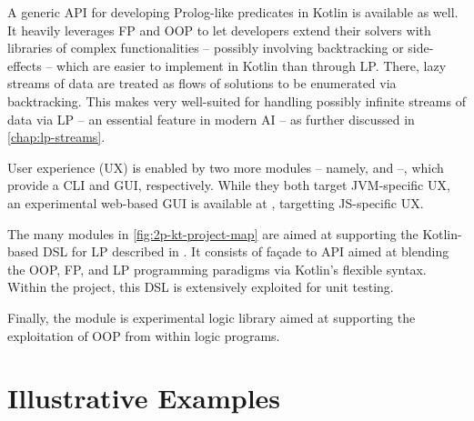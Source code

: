 \documentclass[12pt,a4paper,openright,twoside]{book}
\begin{document}
A generic API for developing Prolog-like predicates in Kotlin is available as well.
%
It heavily leverages FP and OOP to let developers extend their solvers with libraries of complex functionalities -- possibly involving backtracking or side-effects -- which are easier to implement in Kotlin than through LP.
%
There, lazy streams of data are treated as flows of solutions to be enumerated via backtracking.
%
This makes \twopkt{} very well-suited for handling possibly infinite streams of data via LP -- an essential feature in modern AI -- as further discussed in \cref{chap:lp-streams}.

User experience (UX) is enabled by two more modules -- namely,  and  --, which provide a CLI and GUI, respectively.
%
While they both target JVM-specific UX, an experimental web-based GUI is available at \cite{2P-Playground}, targetting JS-specific UX.

The many  modules in \cref{fig:2p-kt-project-map} are aimed at supporting the Kotlin-based DSL for LP described in \cite{kotlindsi4prolog-woa2020}.
%
It consists of façade to \twopkt{} API aimed at blending the OOP, FP, and LP programming paradigms via Kotlin's flexible syntax.
%
Within the \twopkt{} project, this DSL is extensively exploited for unit testing.

Finally, the  module is experimental logic library aimed at supporting the exploitation of OOP from within logic programs.

\section{Illustrative Examples}
\label{sec:illustrations}


\end{document}
